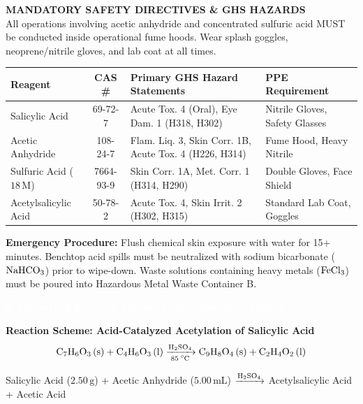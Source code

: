 \documentclass[10pt,a4paper]{article}
\newcommand{\labsection}[2]{%
  \vspace{0.25cm}%
  \begin{tcolorbox}[
    enhanced,
    colback=NavyDark,
    colframe=NavyDark,
    arc=3pt,
    boxrule=0pt,
    left=8pt, right=8pt, top=3pt, bottom=3pt
  ]
    \textcolor{white}{\bfseries\small #1 \quad #2}
  \end{tcolorbox}%
  \vspace{0.05cm}%
}
\begin{document}
\begin{tcolorbox}[
  enhanced,
  colback=AmberLight,
  colframe=AmberDark,
  boxrule=1pt,
  arc=3pt,
  left=8pt, right=8pt, top=5pt, bottom=5pt
]
  {\color{AmberDark}\small\bfseries \faExclamationTriangle \quad MANDATORY SAFETY DIRECTIVES \& GHS HAZARDS}\\[2pt]
  {\scriptsize All operations involving acetic anhydride and concentrated sulfuric acid MUST be conducted inside operational fume hoods. Wear splash goggles, neoprene/nitrile gloves, and lab coat at all times.}

  \vspace{4pt}

  \scriptsize
  \begin{tabularx}{\textwidth}{@{}l c X l@{}}
    \toprule
    \rowcolor{AmberDark!15}
    \textbf{Reagent} & \textbf{CAS \#} & \textbf{Primary GHS Hazard Statements} & \textbf{PPE Requirement} \\
    \midrule
    Salicylic Acid & 69-72-7 & Acute Tox. 4 (Oral), Eye Dam. 1 (H318, H302) & Nitrile Gloves, Safety Glasses \\
    Acetic Anhydride & 108-24-7 & Flam. Liq. 3, Skin Corr. 1B, Acute Tox. 4 (H226, H314) & Fume Hood, Heavy Nitrile \\
    Sulfuric Acid ($18\,\text{M}$) & 7664-93-9 & Skin Corr. 1A, Met. Corr. 1 (H314, H290) & Double Gloves, Face Shield \\
    Acetylsalicylic Acid & 50-78-2 & Acute Tox. 4, Skin Irrit. 2 (H302, H315) & Standard Lab Coat, Goggles \\
    \bottomrule
  \end{tabularx}

  \vspace{4pt}
  \scriptsize\textbf{Emergency Procedure:} Flush chemical skin exposure with water for 15+ minutes. Benchtop acid spills must be neutralized with sodium bicarbonate ($\ce{NaHCO3}$) prior to wipe-down. Waste solutions containing heavy metals ($\ce{FeCl3}$) must be poured into Hazardous Metal Waste Container B.
\end{tcolorbox}

\labsection{3}{Theoretical Reaction Scheme \& Stoichiometric Matrix}

\begin{tcolorbox}[
  enhanced,
  colback=white,
  colframe=TealPrimary,
  boxrule=0.8pt,
  arc=3pt,
  left=8pt, right=8pt, top=5pt, bottom=5pt
]
  \centering
  \textbf{\small Reaction Scheme: Acid-Catalyzed Acetylation of Salicylic Acid}\\[3pt]
  
  \begin{equation*}
    \ce{C7H6O3 (s) + C4H6O3 (l) ->[H2SO4][85^\circ C] C9H8O4 (s) + C2H4O2 (l)}
  \end{equation*}
  
  \vspace{2pt}
  {\scriptsize\color{SlateGray}Salicylic Acid ($2.50\,\text{g}$) + Acetic Anhydride ($5.00\,\text{mL}$) $\xrightarrow{\ce{H2SO4}}$ Acetylsalicylic Acid + Acetic Acid}
\end{tcolorbox}
\end{document}
